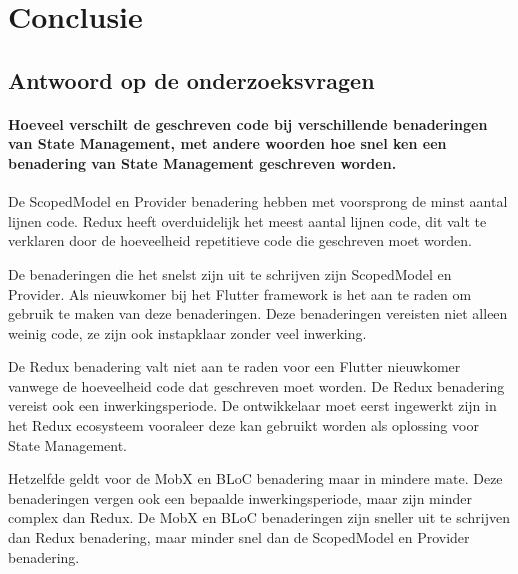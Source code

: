 
\chapter{Conclusie}
\label{ch:conclusie}


\section{Antwoord op de onderzoeksvragen}
\subsubsection{Hoeveel verschilt de geschreven code bij verschillende benaderingen van State Management, met andere woorden hoe snel ken een benadering van State Management geschreven worden.}
De ScopedModel en Provider benadering hebben met voorsprong de minst aantal lijnen code. Redux heeft overduidelijk het meest aantal lijnen code, dit valt te verklaren door de hoeveelheid repetitieve code die geschreven moet worden. 

De benaderingen die het snelst zijn uit te schrijven zijn ScopedModel en Provider. Als nieuwkomer bij het Flutter framework is het aan te raden om gebruik te maken van deze benaderingen. Deze benaderingen vereisten niet alleen weinig code, ze zijn ook instapklaar zonder veel inwerking.  

De Redux benadering valt niet aan te raden voor een Flutter nieuwkomer vanwege de hoeveelheid code dat geschreven moet worden. De Redux benadering vereist ook een inwerkingsperiode. De ontwikkelaar moet eerst ingewerkt zijn in het Redux ecosysteem vooraleer deze kan gebruikt worden als oplossing voor State Management. 

Hetzelfde geldt voor de MobX en BLoC benadering maar in mindere mate. Deze benaderingen vergen ook een bepaalde inwerkingsperiode, maar zijn minder complex dan Redux. De MobX en BLoC benaderingen zijn sneller uit te schrijven dan Redux benadering, maar minder snel dan de ScopedModel en Provider benadering.


